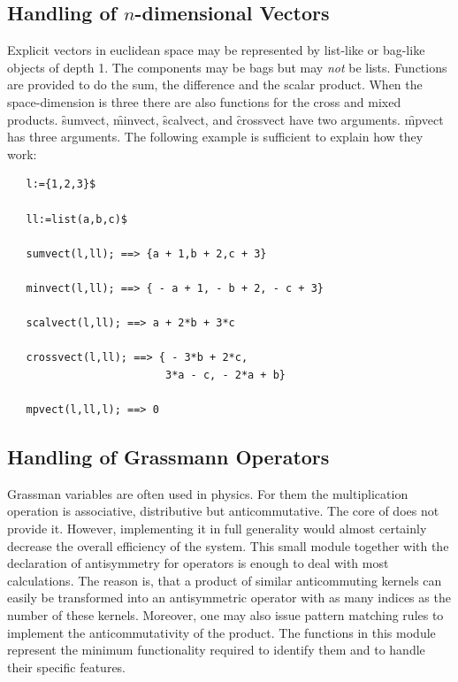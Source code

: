 \subsection{Handling of $n$-dimensional Vectors}
Explicit vectors in  euclidean space may be represented by
list-like or bag-like objects of depth 1.
The components may be bags but may \emph{not} be lists.
Functions are provided to do the sum, the difference and the
scalar product. When the space-dimension is three there are also functions
for the cross and mixed products.
%
%
%
%
%
\hypertarget{operator:SUMVECT}{}%
\hypertarget{operator:MINVECT}{}%
\hypertarget{operator:SCALVECT}{}%
\hypertarget{operator:CROSSVECT}{}%
\hypertarget{operator:MPVECT}{}%
\f{sumvect}, \f{minvect}, \f{scalvect}, and \f{crossvect} have two arguments.
\f{mpvect} has three arguments. The following example
is sufficient to explain how they work:
\begin{verbatim}
   l:={1,2,3}$

   ll:=list(a,b,c)$

   sumvect(l,ll); ==> {a + 1,b + 2,c + 3}

   minvect(l,ll); ==> { - a + 1, - b + 2, - c + 3}

   scalvect(l,ll); ==> a + 2*b + 3*c

   crossvect(l,ll); ==> { - 3*b + 2*c,
                         3*a - c, - 2*a + b}

   mpvect(l,ll,l); ==> 0
\end{verbatim}
\subsection{Handling of Grassmann Operators}
Grassman variables are often used in physics. For them the multiplication
operation is associative, distributive but anticommutative. The
core of \REDUCE does not provide it. However, implementing
it in full generality would almost
certainly decrease the overall efficiency of the system. This small
module together with the declaration of antisymmetry for operators is
enough to deal with most calculations. The reason is, that a
product of similar anticommuting kernels can easily  be transformed
into an antisymmetric operator with as many indices as the number of
these kernels. Moreover, one may also issue pattern matching rules
to implement the anticommutativity of the product.
The functions in this module represent the minimum functionality
required to identify them and to handle their specific features.

